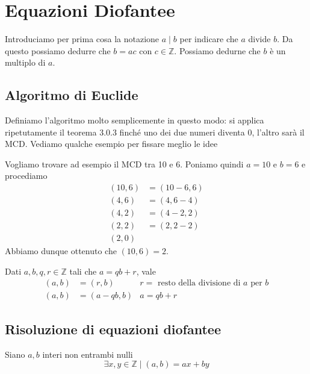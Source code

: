 \section{Equazioni Diofantee}
Introduciamo per prima cosa la notazione $a \mid b$ per indicare che $a$ divide $b$. Da questo
possiamo dedurre che $b = ac$ con $c \in \mathbb{Z}$. Possiamo dedurne che $b$ \`e un multiplo
di $a$.

\subsection{Algoritmo di Euclide}
Definiamo l'algoritmo molto semplicemente in questo modo: si applica ripetutamente
il teorema 3.0.3 finch\'e uno dei due numeri diventa $0$, l'altro sar\`a il MCD.
Vediamo qualche esempio per fissare meglio le idee
\begin{example}
	Vogliamo trovare ad esempio il MCD tra 10 e 6. Poniamo quindi $a = 10$ e $b = 6$ e
	procediamo
	\begin{equation*}
		\begin{array}{ll}
			(10, 6) & = (10 - 6, 6) \\
			(4, 6)  & = (4, 6 - 4)  \\
			(4, 2)  & = (4 - 2, 2)  \\
			(2, 2)  & = (2, 2 - 2)  \\
			(2, 0)
		\end{array}
	\end{equation*}
	Abbiamo dunque ottenuto che $(10, 6) = 2$.
\end{example}

\begin{theorem}
	Dati $a, b, q, r \in \mathbb{Z}$ tali che $a = qb + r$, vale
	\begin{equation*}
		\begin{array}{lll}
			(a, b) & = (r, b)      & \text{$r =$ resto della divisione di $a$ per $b$} \\
			(a, b) & = (a - qb, b) & \text{$a = qb + r$}
		\end{array}
	\end{equation*}
\end{theorem}

\subsection{Risoluzione di equazioni diofantee}
\begin{theorem}
	Siano $a, b$ interi non entrambi nulli
	\begin{equation*}
		\exists x, y \in \mathbb{Z} \mid (a, b) = ax + by
	\end{equation*}
\end{theorem}

